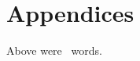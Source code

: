 \documentclass{article}
\newcounter{words}
\begin{document}
\newpage
\section{Appendices}
Above were \thewords\ words. %
\newpage



\nocite{*}
\end{document}

